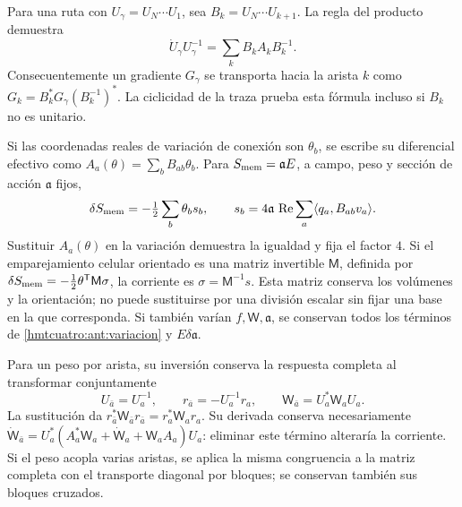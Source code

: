 Para una ruta con \(U_\gamma=U_N\cdots U_1\), sea
\(B_k=U_N\cdots U_{k+1}\). La regla del producto demuestra
\begin{equation}
 \dot U_\gamma U_\gamma^{-1}
 =\sum_k B_kA_kB_k^{-1}.
 \label{hmtcuatro:ant:variacion-ruta}
\end{equation}
Consecuentemente un gradiente \(G_\gamma\) se transporta hacia
la arista \(k\) como
\(G_k=B_k^*G_\gamma(B_k^{-1})^*\). La ciclicidad de la traza
prueba esta fórmula incluso si \(B_k\) no es unitario.

Si las coordenadas reales de variación de conexión son
\(\theta_b\), se escribe su diferencial efectivo como
\(A_a(\theta)=\sum_b B_{ab}\theta_b\). Para
\(S_{\rm mem}=\mathfrak a E\), a campo, peso y sección de acción
\(\mathfrak a\) fijos,
\begin{equation}
 \delta S_{\rm mem}=-\tfrac12\sum_b\theta_b s_b,\qquad
 s_b=4\mathfrak a\,\operatorname{Re}
          \sum_a\langle q_a,B_{ab}v_a\rangle .
 \label{hmtcuatro:ant:corriente-celular}
\end{equation}
Sustituir \(A_a(\theta)\) en la variación demuestra la igualdad
y fija el factor \(4\). Si el emparejamiento celular orientado es
una matriz invertible \(\mathsf M\), definida por
\(\delta S_{\rm mem}=-\frac12\theta^{\mathsf T}\mathsf M\sigma\),
la corriente es \(\sigma=\mathsf M^{-1}s\). Esta matriz conserva
los volúmenes y la orientación; no puede sustituirse por una
división escalar sin fijar una base en la que corresponda.
Si también varían \(f,\mathsf W,\mathfrak a\), se conservan todos
los términos de \eqref{hmtcuatro:ant:variacion} y \(E\delta\mathfrak a\).

Para un peso por arista, su inversión conserva la respuesta completa
al transformar conjuntamente
\[
 U_{\bar a}=U_a^{-1},\qquad
 r_{\bar a}=-U_a^{-1}r_a,\qquad
 \mathsf W_{\bar a}=U_a^*\mathsf W_aU_a .
\]
La sustitución da
\(r_{\bar a}^*\mathsf W_{\bar a}r_{\bar a}=r_a^*\mathsf W_ar_a\).
Su derivada conserva necesariamente
\(\dot{\mathsf W}_{\bar a}
=U_a^*(A_a^*\mathsf W_a+\dot{\mathsf W}_a+\mathsf W_aA_a)U_a\):
eliminar este término alteraría la corriente. Si el peso acopla varias
aristas, se aplica la misma congruencia a la matriz completa con el
transporte diagonal por bloques; se conservan también sus bloques
cruzados.

